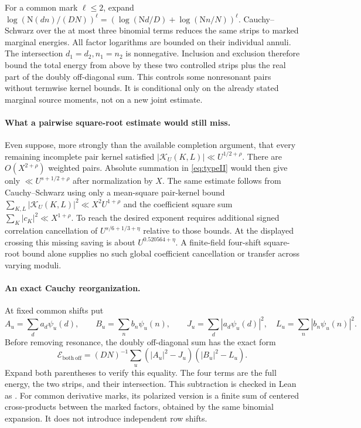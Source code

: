 \documentclass[11pt]{article}
\newcommand{\N}{\mathrm N}
\begin{document}
For a common mark $\ell\le2$, expand
$\log(\N(dn)/(DN))^\ell=
 (\log(\N d/D)+\log(\N n/N))^\ell$.
Cauchy--Schwarz over the at most three binomial terms reduces the same
strips to marked marginal energies. All factor logarithms are bounded
on their individual annuli.
The intersection $d_1=d_2,n_1=n_2$ is nonnegative. Inclusion and exclusion
therefore bound the total energy from above by these two controlled strips
plus the real part of the doubly off-diagonal sum.
This controls some nonresonant pairs without termwise kernel bounds.
It is conditional only on the already stated marginal source moments,
not on a new joint estimate.

\paragraph{What a pairwise square-root estimate would still miss.}
Even suppose, more strongly than the available completion argument,
that every remaining incomplete pair kernel satisfied
$|\mathcal K_U(K,L)|\ll U^{1/2+\rho}$.
There are $O(X^{2+\rho})$ weighted pairs. Absolute summation in
\eqref{eq:typeII} would then give only
$\ll U^{s+1/2+\rho}$ after normalization by $X$.
The same estimate follows from Cauchy--Schwarz using only a mean-square
pair-kernel bound $\sum_{K,L}|\mathcal K_U(K,L)|^2\ll X^2U^{1+\rho}$
and the coefficient square sum $\sum_K|c_K|^2\ll X^{1+\rho}$.
To reach the desired exponent requires additional signed correlation
cancellation of $U^{s/6+1/3+\eta}$ relative to those bounds.
At the displayed crossing this missing saving is about
$U^{0.520564+\eta}$.
A finite-field four-shift square-root bound alone supplies no such
global coefficient cancellation or transfer across varying moduli.

\paragraph{An exact Cauchy reorganization.}
At fixed common shifts put
\[
 A_u=\sum_d a_d\psi_u(d),\qquad B_u=\sum_n b_n\psi_u(n),
 \qquad J_u=\sum_d|a_d\psi_u(d)|^2,
 \quad L_u=\sum_n|b_n\psi_u(n)|^2.
\]
Before removing resonance, the doubly off-diagonal sum has the exact form
\begin{equation}\label{eq:covariance}
 \mathcal E_{\mathrm{both\ off}}
   =(DN)^{-1}\sum_u (|A_u|^2-J_u)(|B_u|^2-L_u).
\end{equation}
Expand both parentheses to verify this equality.
The four terms are the full energy, the two strips, and their intersection.
This subtraction is checked in Lean as
.
For common derivative marks, its polarized version is a finite sum of
centered cross-products between the marked factors, obtained by the same
binomial expansion. It does not introduce independent row shifts.
\end{document}
